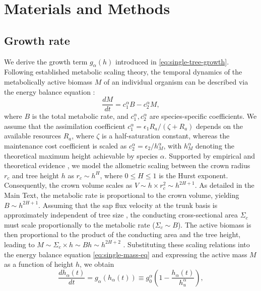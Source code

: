 \documentclass[aps,pre,twocolumn,superscriptaddress,10pt]{revtex4-2}
\begin{document}
\section*{Materials and Methods}

\subsection*{Growth rate} We derive the growth term $g_{\alpha}(h)$ introduced in \cref{eq:single-tree-growth}. 
Following established metabolic scaling theory, the temporal dynamics of the metabolically active biomass $M$ of an individual organism can be described via the energy balance equation \cite{west1997general, enquist1998allometric, enquist2002global, brown2004toward, west2001general, mori2010mixed}:
\begin{equation}
\frac{d M}{dt} = c^{\alpha}_{1} B - c^{\alpha}_{2} M,
\label{eq:single-mass-eq}
\end{equation}
where $B$ is the total metabolic rate, and $c^{\alpha}_1, c^{\alpha}_2$ are species-specific coefficients. We assume that the assimilation coefficient $c_1^{\alpha} = \epsilon_1 R_{a} / (\zeta + R_{a})$ depends on the available resources $R_{a}$, where $\zeta$ is a half-saturation constant, whereas the maintenance cost coefficient is scaled as $c^{\alpha}_2 = \epsilon_2 / h^{\alpha}_{M}$, with $h^{\alpha}_{M}$ denoting the theoretical maximum height achievable by species $\alpha$.
Supported by empirical and theoretical evidence \cite{Comita2007, simini2010self}, we model the allometric scaling between the crown radius $r_c$ and tree height $h$ as $r_c \sim h^H$, where $0 \leq H \leq 1$ is the Hurst exponent. Consequently, the crown volume scales as $V \sim h \times r_c^2 \sim h^{2H +1}$. As detailed in the Main Text, the metabolic rate is proportional to the crown volume, yielding $B \sim h^{2H +1}$. Assuming that the sap flux velocity at the trunk basis is approximately independent of tree size \cite{wullschleger2000radial}, the conducting cross-sectional area $\Sigma_c$ must scale proportionally to the metabolic rate ($\Sigma_c \sim B$). The active biomass is then proportional to the product of the conducting area and the tree height, leading to $M \sim \Sigma_c \times h \sim B h \sim h^{2H+2}$ \cite{simini2010self}.
Substituting these scaling relations into the energy balance equation \cref{eq:single-mass-eq} and expressing the active mass $M$ as a function of height $h$, we obtain
\begin{equation}
\frac{dh_{\alpha}(t)}{d t}=g_\alpha(h_\alpha(t))\equiv g_0^{\alpha}\left(1-\frac{h_\alpha(t)}{h_u^{\alpha}}\right),
\end{equation}
\end{document}

